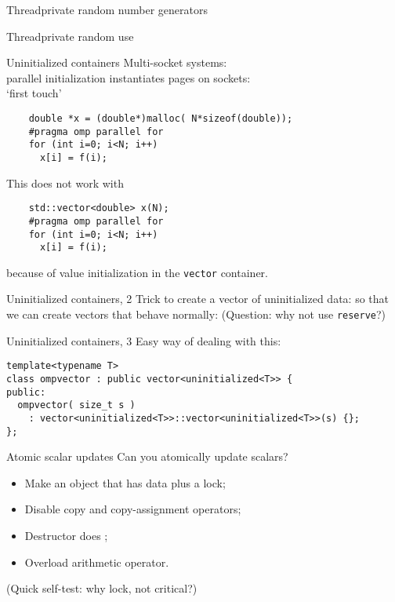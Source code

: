 \documentclass[10pt]{beamer}
\begin{document}
\begin{numberedframe}{Threadprivate random number generators}
  
\end{numberedframe}

\begin{numberedframe}{Threadprivate random use}
  
\end{numberedframe}

\begin{numberedframe}{Uninitialized containers}
  Multi-socket systems:\\
  parallel initialization instantiates pages on sockets:\\
  `first touch'
  \begin{lstlisting}
    double *x = (double*)malloc( N*sizeof(double));
    #pragma omp parallel for
    for (int i=0; i<N; i++)
      x[i] = f(i);
  \end{lstlisting}
  This does not work with
  \begin{lstlisting}
    std::vector<double> x(N);
    #pragma omp parallel for
    for (int i=0; i<N; i++)
      x[i] = f(i);
  \end{lstlisting}
  because of value initialization in the \lstinline{vector} container.
\end{numberedframe}

\begin{numberedframe}{Uninitialized containers, 2}
  Trick to create a vector of uninitialized data:
  so that we can create vectors that behave normally:
  (Question: why not use \lstinline{reserve}?)
\end{numberedframe}

\begin{numberedframe}{Uninitialized containers, 3}
  Easy way of dealing with this:
\begin{lstlisting}
template<typename T>
class ompvector : public vector<uninitialized<T>> {
public:
  ompvector( size_t s )
    : vector<uninitialized<T>>::vector<uninitialized<T>>(s) {};
};
\end{lstlisting}
\end{numberedframe}

\begin{numberedframe}{Atomic scalar updates}
  Can you atomically update scalars?
  \begin{itemize}
  \item Make an object that has data plus a lock;
  \item Disable copy and copy-assignment operators;
  \item Destructor does ;
  \item Overload arithmetic operator.
  \end{itemize}
  (Quick self-test: why lock, not critical?)
\end{numberedframe}
\end{document}
